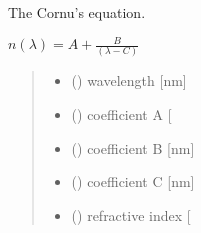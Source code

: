 \documentclass[letterpaper,10pt,english]{sphinxmanual}
\begin{document}

\begin{fulllineitems}
\label{\detokenize{05_refractive_index:skinoptics.refractive_index.n_Cornu}}
\pysigstartsignatures
{}
\pysigstopsignatures
\sphinxAtStartPar
The Cornu’s equation.

\sphinxAtStartPar
\(n(\lambda) = A + \frac{B}{(\lambda - C)}\)
\begin{quote}\begin{description}
\begin{itemize}
\item {} 
\sphinxAtStartPar
{} () \textendash{} wavelength {[}nm{]}

\item {} 
\sphinxAtStartPar
{} () \textendash{} coefficient A {[}\sphinxhyphen{}{]}

\item {} 
\sphinxAtStartPar
{} () \textendash{} coefficient B {[}nm{]}

\item {} 
\sphinxAtStartPar
{} () \textendash{} coefficient C {[}nm{]}

\end{itemize}

\sphinxAtStartPar
\begin{itemize}
\item {} 
\sphinxAtStartPar
{} () \textendash{} refractive index {[}\sphinxhyphen{}{]}

\end{itemize}


\end{description}\end{quote}

\end{fulllineitems}
\end{document}
